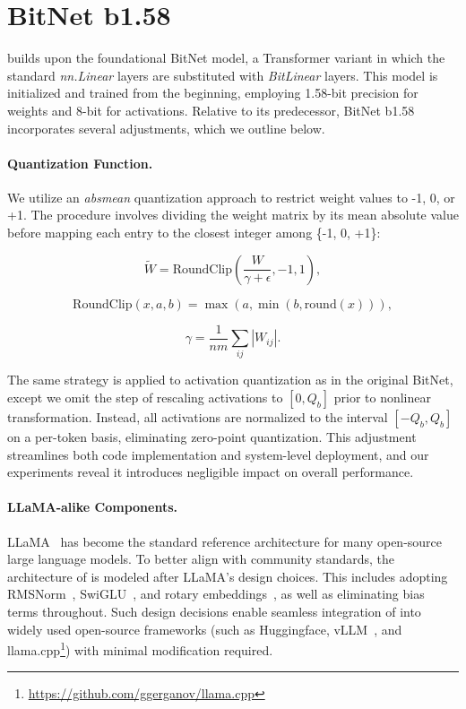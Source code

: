 \section{BitNet b1.58}

 builds upon the foundational BitNet model, a Transformer variant in which the standard \emph{nn.Linear} layers are substituted with \emph{BitLinear} layers. This model is initialized and trained from the beginning, employing 1.58-bit precision for weights and 8-bit for activations. Relative to its predecessor, BitNet b1.58 incorporates several adjustments, which we outline below.

\paragraph{Quantization Function.} We utilize an \emph{absmean} quantization approach to restrict weight values to -1, 0, or +1. The procedure involves dividing the weight matrix by its mean absolute value before mapping each entry to the closest integer among \{-1, 0, +1\}:

\begin{equation}
    \widetilde{W} = \mathrm{RoundClip}(\frac{W}{\gamma + \epsilon}, -1, 1),
\end{equation}

\begin{equation}
    \mathrm{RoundClip}(x, a, b) = \max(a, \min(b, \mathrm{round}(x))),
\end{equation}

\begin{equation}
    \gamma = \frac{1}{nm}\sum_{ij} |W_{ij}|.
\end{equation}

The same strategy is applied to activation quantization as in the original BitNet, except we omit the step of rescaling activations to $[0, Q_b]$ prior to nonlinear transformation. Instead, all activations are normalized to the interval $[-Q_b, Q_b]$ on a per-token basis, eliminating zero-point quantization. This adjustment streamlines both code implementation and system-level deployment, and our experiments reveal it introduces negligible impact on overall performance.

\paragraph{LLaMA-alike Components.}

LLaMA~\cite{llama, llama2} has become the standard reference architecture for many open-source large language models. To better align with community standards, the architecture of  is modeled after LLaMA's design choices. This includes adopting RMSNorm~\cite{rmsnorm}, SwiGLU~\cite{swiglu}, and rotary embeddings~\cite{rope}, as well as eliminating bias terms throughout. Such design decisions enable seamless integration of  into widely used open-source frameworks (such as Huggingface, vLLM~\cite{vllm}, and llama.cpp\footnote{\url{https://github.com/ggerganov/llama.cpp}}) with minimal modification required.

